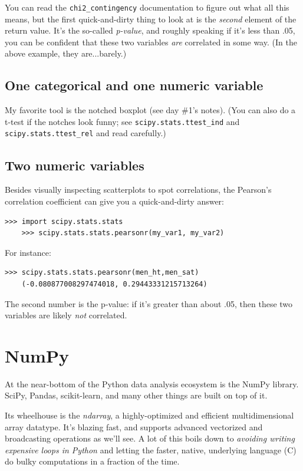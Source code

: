 \documentclass[12pt]{article}
\begin{document}
You can read the \texttt{chi2\_contingency} documentation to figure out what
all this means, but the first quick-and-dirty thing to look at is the
\textit{second} element of the return value. It's the so-called
\textit{p-value}, and roughly speaking if it's less than .05, you can be
confident that these two variables \textit{are} correlated in some way. (In
the above example, they are...barely.)

\subsection{One categorical and one numeric variable}

My favorite tool is the notched boxplot (see day \#1's notes). (You can also
do a t-test if the notches look funny; see \texttt{scipy.stats.ttest\_ind} and
\texttt{scipy.stats.ttest\_rel} and read carefully.)


\subsection{Two numeric variables}

Besides visually inspecting scatterplots to spot correlations, the Pearson's
correlation coefficient can give you a quick-and-dirty answer:

\begin{Verbatim}[fontsize=small,samepage=true,frame=none]
    >>> import scipy.stats.stats
    >>> scipy.stats.stats.pearsonr(my_var1, my_var2)
\end{Verbatim}

For instance:

\begin{Verbatim}[fontsize=small,samepage=true,frame=none]
    >>> scipy.stats.stats.pearsonr(men_ht,men_sat)
    (-0.080877008297474018, 0.29443331215713264)
\end{Verbatim}

The second number is the p-value: if it's greater than about .05, then these
two variables are likely \textit{not} correlated.


\section{NumPy}

At the near-bottom of the Python data analysis ecosystem is the NumPy
library. SciPy, Pandas, scikit-learn, and many other things are built on top
of it.

Its wheelhouse is the \textit{ndarray}, a highly-optimized and efficient
multidimensional array datatype. It's blazing fast, and supports advanced
vectorized and broadcasting operations as we'll see. A lot of this boils down
to \textit{avoiding writing expensive loops in Python} and letting the faster,
native, underlying language (C) do bulky computations in a fraction of the
time.
\end{document}
